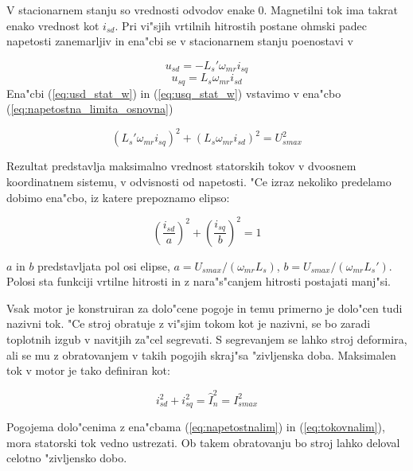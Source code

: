\documentclass[journal,a4paper,twoside]{sty/IEEEtran}
\begin{document}
V stacionarnem stanju so vrednosti odvodov enake 0. Magnetilni tok ima takrat enako vrednost kot $i_{sd}$. Pri vi"sjih vrtilnih hitrostih postane ohmski padec napetosti zanemarljiv in ena"cbi se v stacionarnem stanju poenostavi v

\begin{equation}
u_{sd}= - L_s' \omega_{mr} i_{sq}
\label{eq:usd_stat_w}
\end{equation}
\begin{equation}
u_{sq}=  L_s \omega_{mr}i_{sd}
\label{eq:usq_stat_w}
\end{equation}
 Ena"cbi (\ref{eq:usd_stat_w}) in (\ref{eq:usq_stat_w}) vstavimo v ena"cbo (\ref{eq:napetostna_limita_osnovna})

\begin{equation}
(L_s' \omega_{mr} i_{sq})^2+(L_s \omega_{mr}i_{sd})^2= U_{smax}^2
\label{eq:napetostnalim1}
\end{equation}

Rezultat predstavlja maksimalno vrednost statorskih tokov v dvoosnem koordinatnem sistemu, v odvisnosti od napetosti. "Ce izraz nekoliko predelamo dobimo ena"cbo, iz katere prepoznamo elipso: 

\begin{equation}
(\frac{i_{sd}}{a})^2+(\frac{i_{sq}}{b})^2 = 1
\label{eq:napetostnalim}
\end{equation}

$a$ in $b$ predstavljata pol osi elipse, $a=U_{smax}/(\omega_{mr}L_s)$, $b=U_{smax}/(\omega_{mr}L_s')$. Polosi sta funkciji vrtilne hitrosti in z nara"s"canjem hitrosti postajati manj"si.

Vsak motor je konstruiran za dolo"cene pogoje in temu primerno je dolo"cen tudi nazivni tok. "Ce stroj obratuje z vi"sjim tokom kot je nazivni, se bo zaradi toplotnih izgub v navitjih za"cel segrevati. S segrevanjem se lahko stroj deformira, ali se mu z obratovanjem v takih pogojih skraj"sa "zivljenska doba. Maksimalen tok v motor je tako definiran kot:

\begin{equation}
i_{sd}^2+i_{sq}^2=\hat{I}_{n}^2=I_{smax}^2
\label{eq:tokovnalim}
\end{equation}

Pogojema dolo"cenima z ena"cbama (\ref{eq:napetostnalim}) in (\ref{eq:tokovnalim}), mora statorski tok vedno ustrezati. Ob takem obratovanju bo stroj lahko deloval celotno "zivljensko dobo.\cite{vas}
\end{document}
